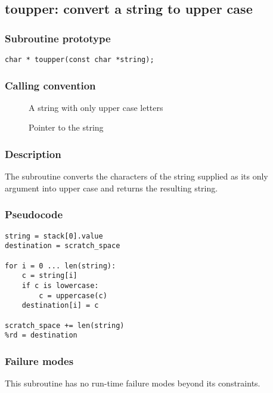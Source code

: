 \clearpage
{}
{}
\label{subr:toupper}
\subsection*{toupper: convert a string to upper case}

\subsubsection*{Subroutine prototype}

\begin{verbatim}
char * toupper(const char *string);
\end{verbatim}

\subsubsection*{Calling convention}

\begin{description}
\item[] A string with only upper case letters
\item[] Pointer to the string
\end{description}

\subsubsection*{Description}

The  subroutine converts the characters of the
string supplied as its only argument into upper case and returns the
resulting string.

\subsubsection*{Pseudocode}

\begin{verbatim}
string = stack[0].value
destination = scratch_space

for i = 0 ... len(string):
    c = string[i]
    if c is lowercase:
        c = uppercase(c)
    destination[i] = c

scratch_space += len(string)
%rd = destination
\end{verbatim}

\subsubsection*{Failure modes}

This subroutine has no run-time failure modes beyond its constraints.
